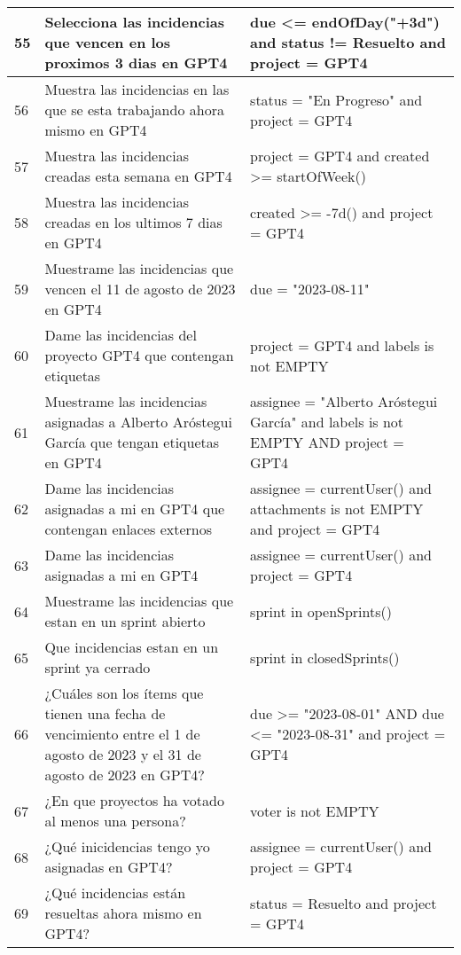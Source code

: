\begin{center}
\begin{longtable}{ | p{1cm} | p{8cm} | p{6cm} | }
        \hline
        55 & Selecciona las incidencias que vencen en los proximos 3 dias en GPT4 & due <= endOfDay("+3d") and status != Resuelto and project = GPT4 \\
        \hline
        56 & Muestra las incidencias en las que se esta trabajando ahora mismo en GPT4 & status = "En Progreso" and project = GPT4 \\
        \hline
        57 & Muestra las incidencias creadas esta semana en GPT4 & project = GPT4 and created >= startOfWeek() \\
        \hline
        58 & Muestra las incidencias creadas en los ultimos 7 dias en GPT4 & created >= -7d() and project = GPT4 \\
        \hline
        59 & Muestrame las incidencias que vencen el 11 de agosto de 2023 en GPT4 & due = "2023-08-11" \\
        \hline
        60 & Dame las incidencias del proyecto GPT4 que contengan etiquetas & project = GPT4 and labels is not EMPTY \\
        \hline
        61 & Muestrame las incidencias asignadas a Alberto Aróstegui García que tengan etiquetas en GPT4 & assignee = "Alberto Aróstegui García" and labels is not EMPTY AND project = GPT4 \\
        \hline
        62 & Dame las incidencias asignadas a mi en GPT4 que contengan enlaces externos & assignee = currentUser() and attachments is not EMPTY and project = GPT4 \\
        \hline
        63 & Dame las incidencias asignadas a mi en GPT4 & assignee = currentUser() and project = GPT4 \\
        \hline
        64 & Muestrame las incidencias que estan en un sprint abierto & sprint in openSprints() \\
        \hline
        65 & Que incidencias estan en un sprint ya cerrado & sprint in closedSprints() \\
        \hline
        66 & ¿Cuáles son los ítems que tienen una fecha de vencimiento entre el 1 de agosto de 2023 y el 31 de agosto de 2023 en GPT4? & due >= "2023-08-01" AND due <= "2023-08-31" and project = GPT4 \\
        \hline
        67 & ¿En que proyectos ha votado al menos una persona? & voter is not EMPTY \\
        \hline
        68 & ¿Qué inicidencias tengo yo asignadas en GPT4? & assignee = currentUser() and project = GPT4 \\
        \hline
        69 & ¿Qué incidencias están resueltas ahora mismo en GPT4? & status = Resuelto and project = GPT4 \\

\end{longtable}
\end{center}

